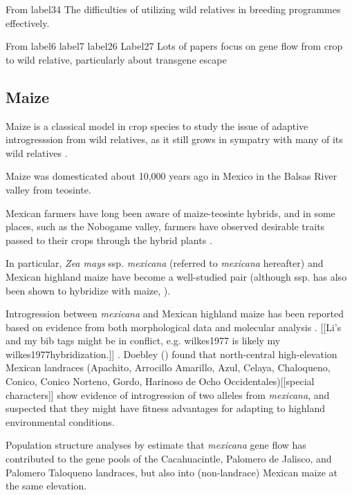 \documentclass[11pt]{article}
\begin{document}
From {label34}
The difficulties of utilizing wild relatives in breeding programmes effectively.

From {label6} {label7} {label26} {Label27}
Lots of papers focus on gene flow from crop to wild relative, particularly about transgene escape

\subsection*{Maize}

Maize is a classical model in crop species to study the issue of adaptive introgresssion from wild relatives, as it still grows in sympatry with many of its wild relatives \cite{hufford2013}.

Maize was domesticated about 10,000 years ago in Mexico \cite{smith1997initial} \cite{hufford2012comparative} in the Balsas River valley \cite {matsuoka2002single} from teosinte.

Mexican farmers have long been aware of maize-teosinte hybrids, and in some places, such as the Nobogame valley, farmers have observed desirable traits passed to their crops through the hybrid plants \cite{wilkes1977hybridization} \cite{lumholtz1902unknown} \cite{wilkes1970teosinte}.

In particular, \emph{Zea mays} ssp. \emph{mexicana} (referred to \emph{mexicana} hereafter) and Mexican highland maize have become a well-studied pair (although ssp.  has also been shown to hybridize with maize, \cite{wilkes1977hybridization}).

Introgression between \emph{mexicana} and Mexican highland maize has been reported based on evidence from both morphological data \cite{wilkes1977, lauter2004, doebley1984} and molecular analysis \cite{matsuoka2002, vanHeerwaarden2011, doebley1987, warburton2011, fukunaga2005}. [[Li's and my bib tags might be in conflict, e.g. wilkes1977 is likely my wilkes1977hybridization.]]
.
 Doebley (\cite{doebley1987patterns}) found that north-central high-elevation Mexican landraces (Apachito, Arrocillo Amarillo, Azul, Celaya, Chaloqueno, Conico, Conico Norteno, Gordo, Harinoso de Ocho Occidentales)[[special characters]] show evidence of introgression of two alleles from \emph{mexicana}, and suspected that they might have fitness advantages for adapting to highland environmental conditions.

Population structure analyses by \cite{matsuoka2002single} estimate that \emph{mexicana} gene flow has contributed to the gene pools of the Cacahuacintle, Palomero de Jalisco, and Palomero Taloqueno landraces, but also into (non-landrace) Mexican maize at the same elevation.
\end{document}
